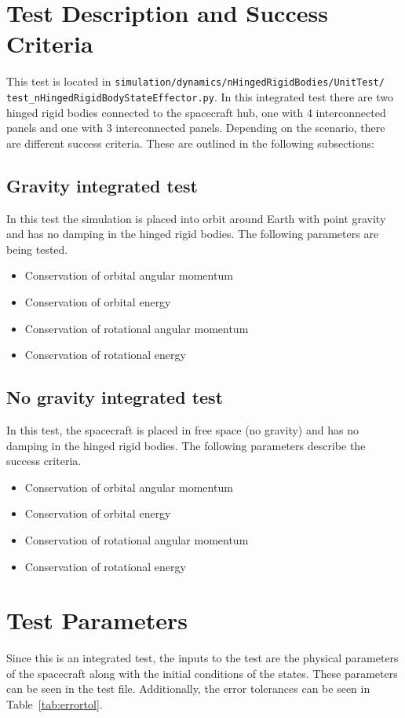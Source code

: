 \section{Test Description and Success Criteria}
This test is located in \texttt{simulation/dynamics/nHingedRigidBodies/UnitTest/\newline
test\_nHingedRigidBodyStateEffector.py}. In this integrated test there are two hinged rigid bodies connected to the spacecraft hub, one with 4 interconnected panels and one with 3 interconnected panels.  Depending on the scenario, there are different success criteria. These are outlined in the following subsections:
\subsection{Gravity integrated test}
In this test the simulation is placed into orbit around Earth with point gravity and has no damping in the hinged rigid bodies. The following parameters are being tested.
\begin{itemize}
	\item Conservation of orbital angular momentum
	\item Conservation of orbital energy
	\item Conservation of rotational angular momentum
	\item Conservation of rotational energy
\end{itemize}

\subsection{No gravity integrated test}
In this test, the spacecraft is placed in free space (no gravity) and has no damping in the hinged rigid bodies. The following parameters describe the success criteria.
\begin{itemize}
\item Conservation of orbital angular momentum
\item Conservation of orbital energy
\item Conservation of rotational angular momentum
\item Conservation of rotational energy
\end{itemize}

\section{Test Parameters}

Since this is an integrated test, the inputs to the test are the physical parameters of the spacecraft along with the initial conditions of the states. These parameters can be seen in the test file. Additionally, the error tolerances can be seen in Table~\ref{tab:errortol}.

